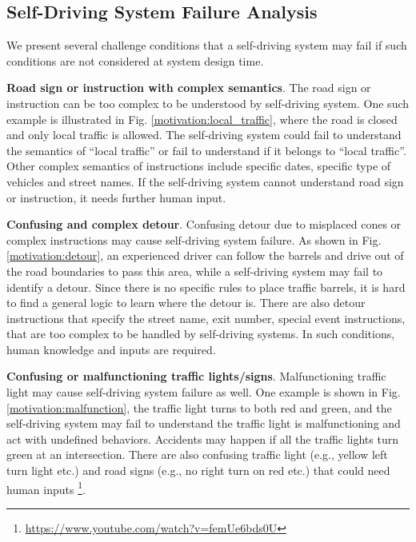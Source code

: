 \subsection{Self-Driving System Failure Analysis}
\label{sec_failure}

We present several challenge conditions that a self-driving system
may fail if such conditions are not considered at system
design time. 


\textbf{Road sign or instruction with complex semantics}. 
The road sign or instruction can be too complex to be 
understood by self-driving system. 
One such example is illustrated in Fig. \ref{motivation:local_traffic}, 
where the road is closed and only local traffic is allowed. 
The self-driving system could fail to understand 
the semantics of ``local traffic'' or
fail to understand if it belongs to ``local traffic''.
Other complex semantics of instructions include
specific dates, specific type of vehicles 
and street names. 
If the self-driving system cannot understand road sign 
or instruction, it needs further human input. 


\textbf{Confusing and complex detour}.
Confusing detour due to misplaced cones or complex instructions 
may cause self-driving system failure. 
As shown in Fig. \ref{motivation:detour}, an experienced driver
can follow the barrels and drive out of the road boundaries
to pass this area, while a self-driving system may 
fail to identify a detour. 
Since there is no specific rules to place
traffic barrels, it is hard to find a general logic to 
learn where the detour is. 
There are also detour instructions that specify the street
name, exit number, special event instructions, 
that are too complex to be handled
by self-driving systems.
In such conditions, human knowledge and inputs are required. 

\textbf{Confusing or malfunctioning traffic lights/signs}.
Malfunctioning traffic light may cause self-driving
system failure as well. 
One example is shown in Fig. \ref{motivation:malfunction}, 
the traffic light turns to both red and green, 
and the self-driving system may fail to understand 
the traffic light is malfunctioning and act
with undefined behaviors.
Accidents may happen if all the traffic lights turn green at
an intersection.  
There are also confusing traffic light (e.g., yellow left turn light etc.)
and road signs (e.g., no right turn on red etc.) that
could need human inputs
\footnote{\url{https://www.youtube.com/watch?v=femUe6bds0U}}. 



